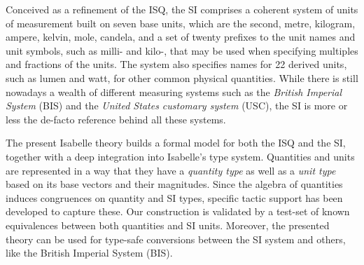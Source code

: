 \documentclass[11pt,a4paper]{book}
\begin{document}
Conceived as a refinement of the ISQ, the SI comprises a coherent system of units of measurement built on seven base
units, which are the second, metre, kilogram, ampere, kelvin, mole, candela, and a set of twenty prefixes to the unit
names and unit symbols, such as milli- and kilo-, that may be used when specifying multiples and fractions of the
units. The system also specifies names for 22 derived units, such as lumen and watt, for other common physical
quantities. While there is still nowadays a wealth of different measuring systems such as the \emph{British Imperial
  System} (BIS) and the \emph{United States customary system} (USC), the SI is more or less the de-facto reference
behind all these systems.

The present Isabelle theory builds a formal model for both the ISQ and the SI, together with a deep integration into
Isabelle's type system\cite{nipkow.ea:isabelle:2002}. Quantities and units are represented in a way that they have a
\emph{quantity type} as well as a \emph{unit type} based on its base vectors and their magnitudes. Since the algebra of
quantities induces congruences on quantity and SI types, specific tactic support has been developed to capture these.
Our construction is validated by a test-set of known equivalences between both quantities and SI units.  Moreover, the
presented theory can be used for type-safe conversions between the SI system and others, like the British Imperial
System (BIS).


% 
\end{document}
